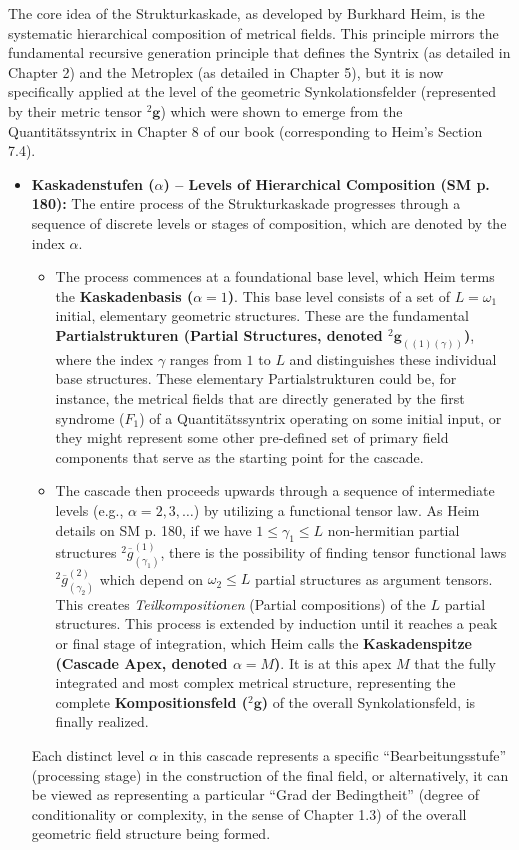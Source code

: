 \documentclass[12pt]{article}
\newcommand{\q}[1]{\enquote{#1}}
\newcommand{\syndrom}{F} %
\newcommand{\kompositionsfeld}{{}^2\mathbf{g}}
\newcommand{\partialstruktur}[1]{{}^2\mathbf{g}_{(#1)}} %
\newcommand{\kaskadenstufe}{\alpha}
\begin{document}
The core idea of the Strukturkaskade, as developed by Burkhard Heim, is the systematic hierarchical composition of metrical fields. This principle mirrors the fundamental recursive generation principle that defines the Syntrix (as detailed in Chapter 2) and the Metroplex (as detailed in Chapter 5), but it is now specifically applied at the level of the geometric Synkolationsfelder (represented by their metric tensor \( \kompositionsfeld \)) which were shown to emerge from the Quantitätssyntrix in Chapter 8 of our book (corresponding to Heim's Section 7.4).

\begin{itemize}
    \item \textbf{Kaskadenstufen (\( \kaskadenstufe \)) – Levels of Hierarchical Composition (SM p. 180):}
    The entire process of the Strukturkaskade progresses through a sequence of discrete levels or stages of composition, which are denoted by the index \( \kaskadenstufe \).
    \begin{itemize}
        \item The process commences at a foundational base level, which Heim terms the \textbf{Kaskadenbasis (\( \kaskadenstufe=1 \))}. This base level consists of a set of \( L = \omega_1 \) initial, elementary geometric structures. These are the fundamental \textbf{Partialstrukturen (Partial Structures, denoted \( \partialstruktur{(1)(\gamma)} \))}, where the index \( \gamma \) ranges from \( 1 \) to \( L \) and distinguishes these individual base structures. These elementary Partialstrukturen could be, for instance, the metrical fields that are directly generated by the first syndrome (\(\syndrom_1\)) of a Quantitätssyntrix operating on some initial input, or they might represent some other pre-defined set of primary field components that serve as the starting point for the cascade.
        \item The cascade then proceeds upwards through a sequence of intermediate levels (e.g., \( \kaskadenstufe = 2, 3, \dots \)) by utilizing a functional tensor law. As Heim details on SM p. 180, if we have $1 \le \gamma_1 \le L$ non-hermitian partial structures $^2\overline{g}_{(\gamma_1)}^{(1)}$, there is the possibility of finding tensor functional laws $^2\overline{g}_{(\gamma_2)}^{(2)}$ which depend on $\omega_2 \le L$ partial structures as argument tensors. This creates \textit{Teilkompositionen} (Partial compositions) of the $L$ partial structures. This process is extended by induction until it reaches a peak or final stage of integration, which Heim calls the \textbf{Kaskadenspitze (Cascade Apex, denoted \( \kaskadenstufe=M \))}. It is at this apex \(M\) that the fully integrated and most complex metrical structure, representing the complete \textbf{Kompositionsfeld (\( \kompositionsfeld \))} of the overall Synkolationsfeld, is finally realized.
    \end{itemize}
    Each distinct level \( \kaskadenstufe \) in this cascade represents a specific \q{Bearbeitungsstufe} (processing stage) in the construction of the final field, or alternatively, it can be viewed as representing a particular \q{Grad der Bedingtheit} (degree of conditionality or complexity, in the sense of Chapter 1.3) of the overall geometric field structure being formed.


\end{itemize}
\end{document}
